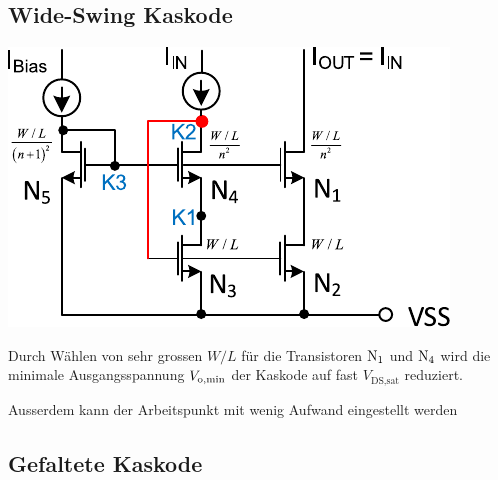 \subsection{Wide-Swing Kaskode}

\begin{minipage}[t]{0.4\columnwidth}
    \includegraphics[width=\columnwidth, align=t]{images/07_wide_swing_kaskode.pdf}
\end{minipage}
\hfill
\begin{minipage}[t]{0.56\columnwidth}
    Durch Wählen von sehr grossen $W/L$ für die Transistoren $\rm{N_1}$ und $\rm{N_4}$ wird die minimale Ausgangsspannung $V_{\rm o, min}$ der Kaskode auf fast $V_\text{DS,sat}$ reduziert.
    
    Ausserdem kann der Arbeitspunkt mit wenig Aufwand eingestellt werden
\end{minipage}


\subsection{Gefaltete Kaskode}

